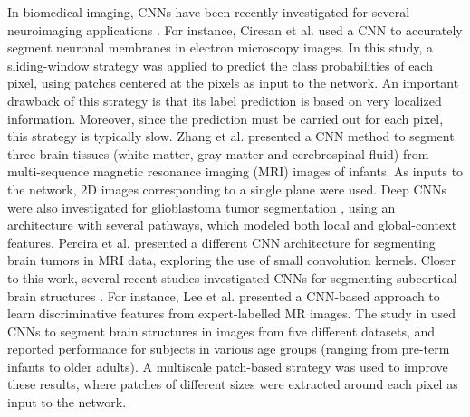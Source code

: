\documentclass[twoside,fleqn,espcrc2]{elsarticle}
\begin{document}
In biomedical imaging, CNNs have been recently investigated for several neuroimaging applications \cite{ciresan2012deep,zhang2015deep,havaei2016brain,pereira2016brain}. For instance, Ciresan et al. \cite{ciresan2012deep} used a CNN to accurately segment neuronal membranes in electron microscopy images. In this study, a sliding-window strategy was applied to predict the class probabilities of each pixel, using patches centered at the pixels as input to the network. An important drawback of this strategy is that its label prediction is based on very localized information. Moreover, since the prediction must be carried out for each pixel, this strategy is typically slow. %
Zhang et al. \cite{zhang2015deep} presented a CNN method to segment three brain tissues (white matter, gray matter and cerebrospinal fluid) from multi-sequence magnetic resonance imaging (MRI) images of infants. As inputs to the network, 2D images corresponding to a single plane were used. Deep CNNs were also investigated for glioblastoma tumor segmentation \cite{havaei2016brain}, using an architecture with several pathways, which modeled both local and global-context features. Pereira et al. \cite{pereira2016brain} presented a different CNN architecture for segmenting brain tumors in MRI data, exploring the use of small convolution kernels. Closer to this work, several recent studies investigated CNNs for segmenting subcortical brain structures \cite{shakeri2016sub,lee2011towards,moeskops2016automatic,milletari2016hough,Brebisson2015deep}. For instance, Lee et al. \cite{lee2011towards} presented a CNN-based approach to learn discriminative features from expert-labelled MR images. The study in \cite{moeskops2016automatic} used CNNs to segment brain structures in images from five different datasets, and reported performance for subjects in various age groups (ranging from pre-term infants to older adults). A multiscale patch-based strategy was used to improve these results, where patches of different sizes were extracted around each pixel as input to the network.
\end{document}
